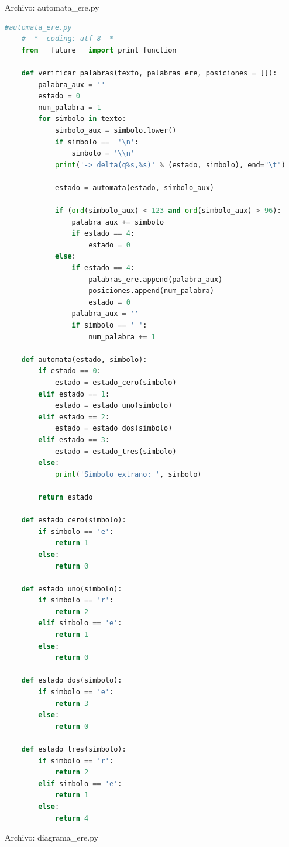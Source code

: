 	Archivo: automata\_ere.py
	\begin{lstlisting}[language=Python]
	#automata_ere.py
	# -*- coding: utf-8 -*-
	from __future__ import print_function
	
	def verificar_palabras(texto, palabras_ere, posiciones = []):
		palabra_aux = ''
		estado = 0
		num_palabra = 1
		for simbolo in texto:
			simbolo_aux = simbolo.lower()
			if simbolo ==  '\n':
				simbolo = '\\n'
			print('-> delta(q%s,%s)' % (estado, simbolo), end="\t")
			
			estado = automata(estado, simbolo_aux)
			
			if (ord(simbolo_aux) < 123 and ord(simbolo_aux) > 96):
				palabra_aux += simbolo
				if estado == 4:
					estado = 0
			else:
				if estado == 4:
					palabras_ere.append(palabra_aux)
					posiciones.append(num_palabra)
					estado = 0
				palabra_aux = ''
				if simbolo == ' ':
					num_palabra += 1
	
	def automata(estado, simbolo):
		if estado == 0:
			estado = estado_cero(simbolo)
		elif estado == 1:
			estado = estado_uno(simbolo)
		elif estado == 2:
			estado = estado_dos(simbolo)
		elif estado == 3:
			estado = estado_tres(simbolo)
		else:
			print('Simbolo extrano: ', simbolo)
		
		return estado
	
	def estado_cero(simbolo):
		if simbolo == 'e':
			return 1
		else:
			return 0
	
	def estado_uno(simbolo):
		if simbolo == 'r':
			return 2
		elif simbolo == 'e':
			return 1
		else:
			return 0
	
	def estado_dos(simbolo):
		if simbolo == 'e':
			return 3
		else:
			return 0
	
	def estado_tres(simbolo):
		if simbolo == 'r':
			return 2
		elif simbolo == 'e':
			return 1
		else:
			return 4
	\end{lstlisting}
	Archivo: diagrama\_ere.py
